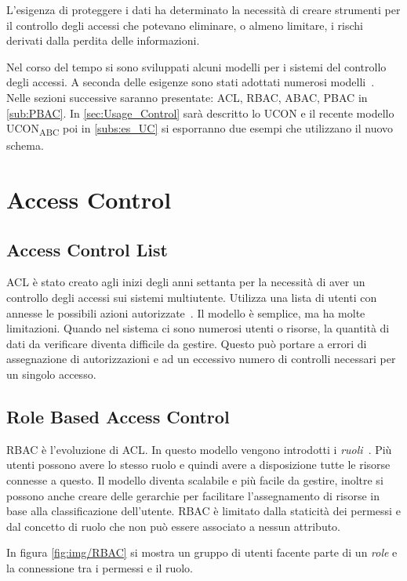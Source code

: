 \label{chap:Access Control e Usage Control}
L'esigenza di proteggere i dati ha determinato la necessità di creare strumenti per il controllo degli accessi che potevano eliminare,
 o almeno limitare, i rischi derivati dalla perdita delle informazioni.\par
Nel corso del tempo si sono sviluppati alcuni modelli per i sistemi del controllo degli accessi. A seconda delle esigenze
sono stati adottati numerosi modelli~\cite{NISTACM}. Nelle sezioni successive saranno presentate:
\ac{ACL}, \ac{RBAC}, \ac{ABAC}, \ac{PBAC} in \ref{sub:PBAC}.
In \ref{sec:Usage_Control} sarà descritto lo \ac{UCON} e il recente modello UCON\textsubscript{ABC} poi in \ref{subs:es_UC}
si esporranno due esempi che utilizzano il nuovo schema.
\section{Access Control}

\subsection*{Access Control List}
\label{sub:ACL}
\ac{ACL} è stato creato agli inizi degli anni settanta per la necessità di aver un controllo degli
accessi sui sistemi multiutente.
Utilizza una lista di utenti con annesse le possibili azioni autorizzate~\cite{ACL}. Il modello è semplice,
ma ha molte limitazioni. Quando nel sistema ci sono numerosi utenti o risorse, la quantità di dati da verificare diventa
difficile da gestire. Questo può portare a errori di assegnazione di autorizzazioni e ad un eccessivo numero di controlli
necessari per un singolo accesso.
\subsection*{Role Based Access Control}
\label{sub:RBAC}
\ac{RBAC} è l'evoluzione di \ac{ACL}. In questo modello vengono introdotti i \emph{ruoli}~\cite{RBAC}. Più utenti
possono avere lo stesso ruolo e quindi avere a disposizione tutte le risorse connesse a questo. Il modello
diventa scalabile e più facile da gestire, inoltre si possono anche creare delle gerarchie per facilitare l'assegnamento di
risorse in base alla classificazione dell'utente. \ac{RBAC} è limitato dalla staticità dei permessi e dal concetto di ruolo
che non può essere associato a nessun attributo.
\par In figura \ref{fig:img/RBAC} si mostra un gruppo di utenti
facente parte di un \emph{role} e la connessione tra i permessi e il ruolo.
